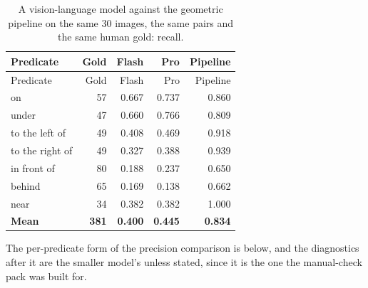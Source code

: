\begin{center}
\setlength{\tabcolsep}{6pt}
\small
\begin{longtable}{lrrrr}
\caption[A vision-language model against the geometric pipeline]{A vision-language model against the geometric pipeline on the same 30 images, the same pairs and the same human gold: recall.}\\
\hline
Predicate & Gold & Flash & Pro & Pipeline \\
\hline
\endfirsthead
\hline
Predicate & Gold & Flash & Pro & Pipeline \\
\hline
\endhead
on & 57 & 0.667 & 0.737 & 0.860 \\
under & 47 & 0.660 & 0.766 & 0.809 \\
to the left of & 49 & 0.408 & 0.469 & 0.918 \\
to the right of & 49 & 0.327 & 0.388 & 0.939 \\
in front of & 80 & 0.188 & 0.237 & 0.650 \\
behind & 65 & 0.169 & 0.138 & 0.662 \\
near & 34 & 0.382 & 0.382 & 1.000 \\
\textbf{Mean} & \textbf{381} & \textbf{0.400} & \textbf{0.445} & \textbf{0.834} \\
\hline
\end{longtable}
\end{center}

The per-predicate form of the precision comparison is below, and the diagnostics after it are the smaller model's unless stated, since it is the one the manual-check pack was built for.

